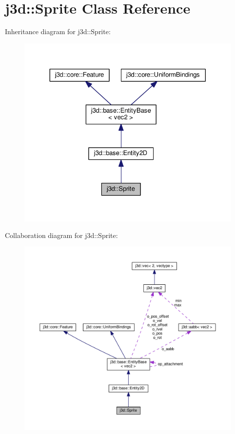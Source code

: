 \hypertarget{classj3d_1_1Sprite}{}\section{j3d\+:\+:Sprite Class Reference}
\label{classj3d_1_1Sprite}


Inheritance diagram for j3d\+:\+:Sprite\+:
\nopagebreak
\begin{figure}[H]
\begin{center}
\leavevmode
\includegraphics[width=324pt]{classj3d_1_1Sprite__inherit__graph}
\end{center}
\end{figure}


Collaboration diagram for j3d\+:\+:Sprite\+:
\nopagebreak
\begin{figure}[H]
\begin{center}
\leavevmode
\includegraphics[width=350pt]{classj3d_1_1Sprite__coll__graph}
\end{center}
\end{figure}
